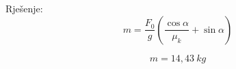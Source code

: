 
Rješenje: 
$$ m=\frac{F_0}{g}\left( \frac{\cos\alpha}{\mu_k} + \sin\alpha\right)  $$

$$ m=14,43\ kg$$




